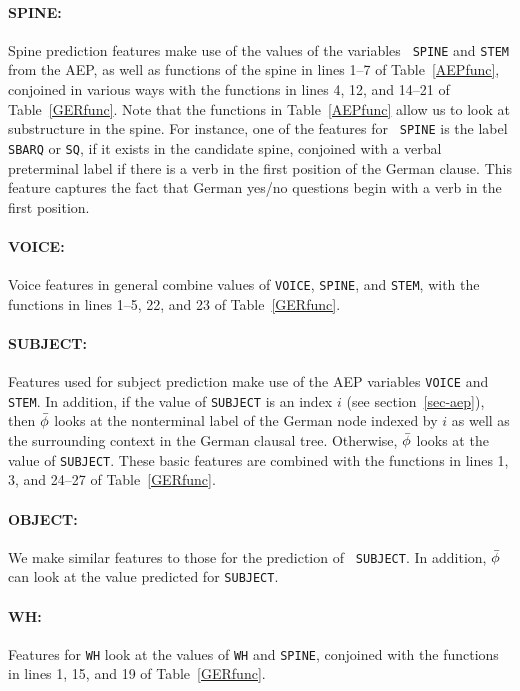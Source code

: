 \documentclass[10pt]{report}
\theoremstyle{plain}
\begin{document}
{\paragraph{SPINE:} 
Spine prediction features make use of the values of the variables {\tt
SPINE} and {\tt STEM} from the AEP, as well as functions of the spine
in lines 1--7 of Table~\ref{AEPfunc}, conjoined in various ways with
the functions in lines 4, 12, and 14--21 of Table~\ref{GERfunc}. Note
that the functions in Table~\ref{AEPfunc} allow us to look at
substructure in the spine. For instance, one of the features for {\tt
SPINE} is the label {\tt SBARQ} or {\tt SQ}, if it exists in the
candidate spine, conjoined with a verbal preterminal label if there is
a verb in the first position of the German clause. This feature
captures the fact that German yes/no questions begin with a verb in
the first position.

\paragraph{VOICE:} 
Voice features in general combine values of {\tt VOICE}, {\tt SPINE},
and {\tt STEM}, with the functions in lines 1--5, 22, and 23 of
Table~\ref{GERfunc}.

\paragraph{SUBJECT:} 
Features used for subject prediction make use of the AEP variables
{\tt VOICE} and {\tt STEM}. In addition, if the value of {\tt SUBJECT}
is an index $i$ (see section~\ref{sec-aep}), then $\bar{\phi}$ looks at the
nonterminal label of the German node indexed by $i$ as well as the
surrounding context in the German clausal tree. Otherwise, $\bar{\phi}$
looks at the value of {\tt SUBJECT}. These basic features are combined
with the functions in lines 1, 3, and 24--27 of Table~\ref{GERfunc}.

\paragraph{OBJECT:} 
We make similar features to those for the prediction of {\tt
SUBJECT}. In addition, $\bar{\phi}$ can look at the value predicted for
{\tt SUBJECT}.

\paragraph{WH:} 
Features for {\tt WH} look at the values of {\tt WH} and {\tt SPINE},
conjoined with the functions in lines 1, 15, and 19 of
Table~\ref{GERfunc}.

}
\end{document}
